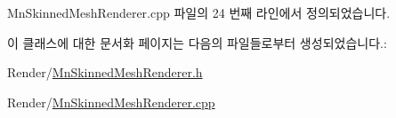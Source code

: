 Mn\+Skinned\+Mesh\+Renderer.\+cpp 파일의 24 번째 라인에서 정의되었습니다.



이 클래스에 대한 문서화 페이지는 다음의 파일들로부터 생성되었습니다.\+:\begin{DoxyCompactItemize}
\item 
Render/\hyperlink{_mn_skinned_mesh_renderer_8h}{Mn\+Skinned\+Mesh\+Renderer.\+h}\item 
Render/\hyperlink{_mn_skinned_mesh_renderer_8cpp}{Mn\+Skinned\+Mesh\+Renderer.\+cpp}\end{DoxyCompactItemize}
